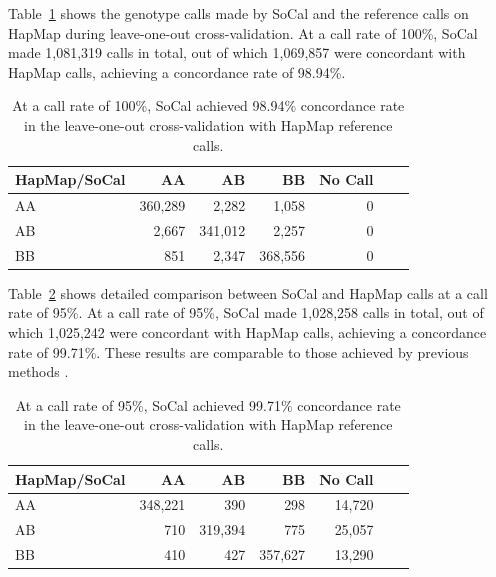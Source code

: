 \documentclass{scrartcl}
\begin{document}
\par
Table~\ref{table:cmp_hapmap_socal_100} shows the genotype calls made by SoCal
and the reference calls on HapMap during leave-one-out cross-validation.
At a call rate of 100\%, SoCal made 1,081,319 calls in total, out of which
1,069,857 were concordant with HapMap calls, achieving a concordance
rate of 98.94\%.

\begin{table}[H]
\centering
\begin{tabular}{l*{5}{r}r}
    \hline
    HapMap/SoCal  & AA       & AB      & BB      & No Call \\ \hline
    AA            & 360,289  & 2,282   & 1,058   & 0  \\
    AB            & 2,667    & 341,012 & 2,257   & 0  \\
    BB            & 851      & 2,347   & 368,556 & 0  \\ \hline
\end{tabular}
\caption{At a call rate of 100\%, SoCal achieved 98.94\% concordance rate
in the leave-one-out cross-validation with HapMap reference calls.}
\label{table:cmp_hapmap_socal_100}
\end{table}

\par
Table~\ref{table:cmp_hapmap_socal_95} shows detailed comparison between
SoCal and HapMap calls at a call rate of 95\%.
At a call rate of 95\%, SoCal made 1,028,258 calls in total, out of which
1,025,242 were concordant with HapMap calls, achieving a concordance
rate of 99.71\%.
These results are comparable to those achieved by previous methods
\cite{rabbee2005,di2005}.

\begin{table}[H]
\centering
\begin{tabular}{l*{5}{r}r}
    \hline
    HapMap/SoCal  & AA       & AB      & BB      & No Call \\ \hline
    AA            & 348,221  & 390     & 298     & 14,720  \\
    AB            & 710      & 319,394 & 775     & 25,057  \\
    BB            & 410      & 427     & 357,627 & 13,290  \\ \hline
\end{tabular}
\caption{At a call rate of 95\%, SoCal achieved 99.71\% concordance rate
in the leave-one-out cross-validation with HapMap reference calls.}
\label{table:cmp_hapmap_socal_95}
\end{table}
\end{document}
